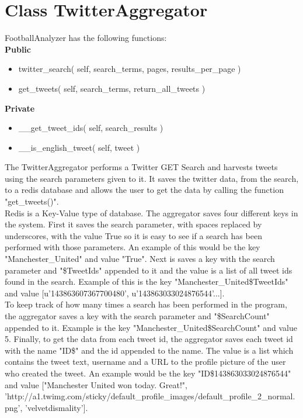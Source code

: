 \clearpage

\section{Class TwitterAggregator} \label{sec:TwitterAggregatorImplementation}
FootballAnalyzer has the following functions:\\

{\bf Public}
\begin{itemize}
\item twitter\_search( self, search\_terms, pages, results\_per\_page )
\item get\_tweets( self, search\_terms, return\_all\_tweets )
\end{itemize}

{\bf Private}
\begin{itemize}
\item \_\_get\_tweet\_ids( self, search\_results )
\item \_\_is\_english\_tweet( self, tweet )
\end{itemize}

The TwitterAggregator performs a Twitter GET Search and harvests tweets using the search parameters given to it. It saves the twitter data, from the search, to a redis database and allows the user to get the data by calling the function "get\_tweets()".\\

Redis is a Key-Value type of database. The aggregator saves four different keys in the system. First it saves the search parameter, with spaces replaced by underscores, with the value True so it is easy to see if a search has been performed with those parameters. An example of this would be the key "Manchester\_United" and value "True". Next is saves a key with the search parameter and "\$TweetIds" appended to it and the value is a list of all tweet ids found in the search. Example of this is the key "Manchester\_United\$TweetIds" and value [u'143863607367700480', u'143863033024876544'...]. \\

To keep track of how many times a search has been performed in the program, the aggregator saves a key with the search parameter and "\$SearchCount" appended to it. Example is the key "Manchester\_United\$SearchCount" and value 5. Finally, to get the data from each tweet id, the aggregator saves each tweet id with the name "ID\$" and the id appended to the name. The value is a list which contains the tweet text, username and a URL to the profile picture of the user who created the tweet. An example would be the key "ID\$143863033024876544" and value ["Manchester United won today. Great!",\\ 'http://a1.twimg.com/sticky/default\_profile\_images/default\_profile\_2\_normal.png', 'velvetdismality']. \\

